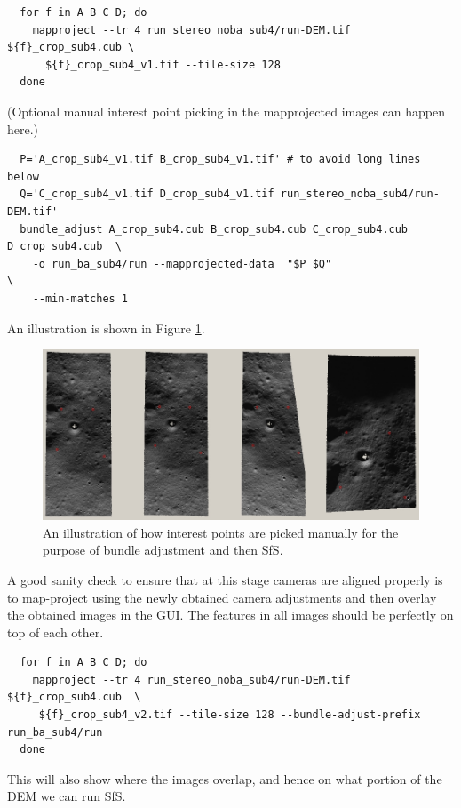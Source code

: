 \begin{verbatim}
  for f in A B C D; do 
    mapproject --tr 4 run_stereo_noba_sub4/run-DEM.tif ${f}_crop_sub4.cub \
      ${f}_crop_sub4_v1.tif --tile-size 128
  done
\end{verbatim}

(Optional manual interest point picking in the mapprojected images can happen here.)

\begin{verbatim}
  P='A_crop_sub4_v1.tif B_crop_sub4_v1.tif' # to avoid long lines below
  Q='C_crop_sub4_v1.tif D_crop_sub4_v1.tif run_stereo_noba_sub4/run-DEM.tif'
  bundle_adjust A_crop_sub4.cub B_crop_sub4.cub C_crop_sub4.cub D_crop_sub4.cub  \
    -o run_ba_sub4/run --mapprojected-data  "$P $Q"                              \
    --min-matches 1
\end{verbatim}

An illustration is shown in Figure \ref{fig:sfs3}.

\begin{figure}[t!]
  \begin{center}
    \includegraphics[width=7in]{images/sfs3.jpg}
    \caption[sfs]{An illustration of how interest points are picked manually for the purpose of bundle adjustment and then SfS.}
    \label{fig:sfs3}
  \end{center}
\end{figure}

A good sanity check to ensure that at this stage cameras are aligned
properly is to map-project using the newly obtained camera adjustments
and then overlay the obtained images in the GUI.  The features in all
images should be perfectly on top of each other.
\begin{verbatim}
  for f in A B C D; do 
    mapproject --tr 4 run_stereo_noba_sub4/run-DEM.tif ${f}_crop_sub4.cub  \
     ${f}_crop_sub4_v2.tif --tile-size 128 --bundle-adjust-prefix run_ba_sub4/run
  done
\end{verbatim}
This will also show where the images overlap, and hence on what portion of the DEM we
can run SfS.


